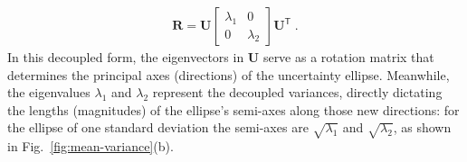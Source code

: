 \begin{align*}
\mathbf{R}=\mathbf{U}\left[\begin{matrix}\lambda _{1}&0\\ 0&\lambda _{2}\end{matrix}\right]\mathbf{U}^{\mathsf{T}} \;.
\end{align*}
In this decoupled form, the eigenvectors in $\mathbf{U}$ serve as a rotation matrix that determines the principal axes (directions) of the uncertainty ellipse. Meanwhile, the eigenvalues $\lambda _{1}$ and $\lambda _{2}$ represent the decoupled variances, directly dictating the lengths (magnitudes) of the ellipse's semi-axes along those new directions: for the ellipse of one standard deviation the semi-axes are $\sqrt{\lambda_1}$ and $\sqrt{\lambda_2}$, as shown in Fig.~\ref{fig:mean-variance}(b).

